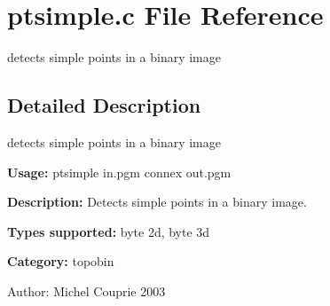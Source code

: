 \section{ptsimple.c File Reference}
\label{ptsimple_8c}
detects simple points in a binary image 



\subsection{Detailed Description}
detects simple points in a binary image 

{\bf Usage:} ptsimple in.pgm connex out.pgm

{\bf Description:} Detects simple points in a binary image.

{\bf Types supported:} byte 2d, byte 3d

{\bf Category:} topobin

\begin{Desc}
\item[Author:]Michel Couprie 2003 \end{Desc}
